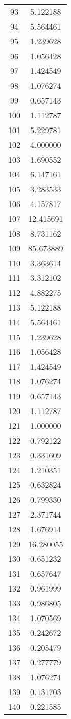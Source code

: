 \documentclass[12pt]{article}
\begin{document}
\begin{longtable}{@{}cc@{}}
93 & 5.122188 \\
94 & 5.564461 \\
95 & 1.239628 \\
96 & 1.056428 \\
97 & 1.424549 \\
98 & 1.076274 \\
99 & 0.657143 \\
100 & 1.112787 \\
101 & 5.229781 \\
102 & 4.000000 \\
103 & 1.690552 \\
104 & 6.147161 \\
105 & 3.283533 \\
106 & 4.157817 \\
107 & 12.415691 \\
108 & 8.731162 \\
109 & 85.673889 \\
110 & 3.363614 \\
111 & 3.312102 \\
112 & 4.882275 \\
113 & 5.122188 \\
114 & 5.564461 \\
115 & 1.239628 \\
116 & 1.056428 \\
117 & 1.424549 \\
118 & 1.076274 \\
119 & 0.657143 \\
120 & 1.112787 \\
121 & 1.000000 \\
122 & 0.792122 \\
123 & 0.331609 \\
124 & 1.210351 \\
125 & 0.632824 \\
126 & 0.799330 \\
127 & 2.371744 \\
128 & 1.676914 \\
129 & 16.280055 \\
130 & 0.651232 \\
131 & 0.657647 \\
132 & 0.961999 \\
133 & 0.986805 \\
134 & 1.070569 \\
135 & 0.242672 \\
136 & 0.205479 \\
137 & 0.277779 \\
138 & 1.076274 \\
139 & 0.131703 \\
140 & 0.221585 \\

\end{longtable}
\end{document}
